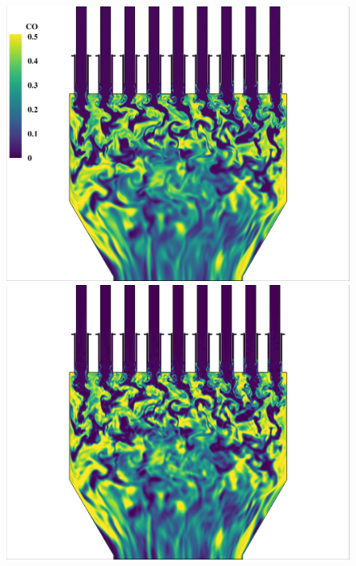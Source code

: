 \begin{figure}
	{\begin{minipage}{0.32\linewidth}
		\includegraphics[width=0.99\linewidth,trim={0.5em 0.5em 15.0em 0.5em},clip]{Chapters/HPROMResults/Images/nineElem/deim/contours/fom_co_z.png}
	\end{minipage}
	\begin{minipage}{0.32\linewidth}
		\includegraphics[width=0.99\linewidth,trim={0.5em 0.5em 15.0em 0.5em},clip]{Chapters/HPROMResults/Images/nineElem/deim/contours/deim_0p001_co_z.png}
	\end{minipage}
	\begin{minipage}{0.32\linewidth}

\end{minipage}}
\end{figure}

